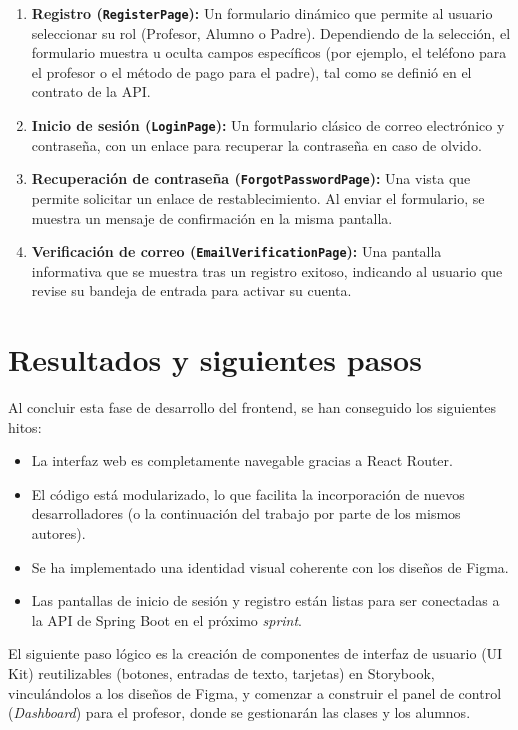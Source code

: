 \documentclass[12pt,a4paper]{report}
\begin{document}
\begin{enumerate}
    \item \textbf{Registro (\texttt{RegisterPage}):} Un formulario dinámico que permite al usuario seleccionar su rol (Profesor, Alumno o Padre). Dependiendo de la selección, el formulario muestra u oculta campos específicos (por ejemplo, el teléfono para el profesor o el método de pago para el padre), tal como se definió en el contrato de la API.
    \item \textbf{Inicio de sesión (\texttt{LoginPage}):} Un formulario clásico de correo electrónico y contraseña, con un enlace para recuperar la contraseña en caso de olvido.
    \item \textbf{Recuperación de contraseña (\texttt{ForgotPasswordPage}):} Una vista que permite solicitar un enlace de restablecimiento. Al enviar el formulario, se muestra un mensaje de confirmación en la misma pantalla.
    \item \textbf{Verificación de correo (\texttt{EmailVerificationPage}):} Una pantalla informativa que se muestra tras un registro exitoso, indicando al usuario que revise su bandeja de entrada para activar su cuenta.
\end{enumerate}

\section{Resultados y siguientes pasos}

Al concluir esta fase de desarrollo del frontend, se han conseguido los siguientes hitos:

\begin{itemize}
    \item La interfaz web es completamente navegable gracias a React Router.
    \item El código está modularizado, lo que facilita la incorporación de nuevos desarrolladores (o la continuación del trabajo por parte de los mismos autores).
    \item Se ha implementado una identidad visual coherente con los diseños de Figma.
    \item Las pantallas de inicio de sesión y registro están listas para ser conectadas a la API de Spring Boot en el próximo \textit{sprint}.
\end{itemize}

El siguiente paso lógico es la creación de componentes de interfaz de usuario (UI Kit) reutilizables (botones, entradas de texto, tarjetas) en Storybook, vinculándolos a los diseños de Figma, y comenzar a construir el panel de control (\textit{Dashboard}) para el profesor, donde se gestionarán las clases y los alumnos.
\end{document}
